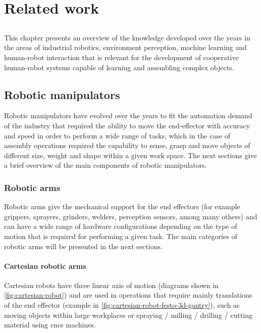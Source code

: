 \chapter{Related work}\label{chap:related-work}

\section*{}

This chapter presents an overview of the knowledge developed over the years in the areas of industrial robotics, environment perception, machine learning and human-robot interaction that is relevant for the development of cooperative human-robot systems capable of learning and assembling complex objects.


\section{Robotic manipulators}

Robotic manipulators have evolved over the years to fit the automation demand of the industry that required the ability to move the end-effector with accuracy and speed in order to perform a wide range of tasks, which in the case of assembly operations required the capability to sense, grasp and move objects of different size, weight and shape within a given work space. The next sections give a brief overview of the main components of robotic manipulators.


\subsection{Robotic arms}

Robotic arms give the mechanical support for the end effectors (for example grippers, sprayers, grinders, welders, perception sensors, among many others) and can have a wide range of hardware configurations depending on the type of motion that is required for performing a given task. The main categories of robotic arms will be presented in the next sections.


\subsubsection{Cartesian robotic arms}

Cartesian robots have three linear axis of motion (diagrams shown in \cref{fig:cartesian-robot}) and are used in operations that require mainly translations of the end effector (example in \cref{fig:cartesian-robot-festo-3d-gantry}), such as moving objects within large workplaces or spraying / milling / drilling / cutting material using \glspl{cnc} machines.

